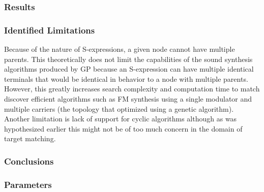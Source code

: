 \documentclass[12pt]{article}
\begin{document}
\subsubsection{Results}
\subsubsection{Identified Limitations}
Because of the nature of S-expressions, a given node cannot have multiple parents. This theoretically does not limit the capabilities of the sound synthesis algorithms produced by GP because an S-expression can have multiple identical terminals that would be identical in behavior to a node with multiple parents. However, this greatly increases search complexity and computation time to match discover efficient algorithms such as FM synthesis using a single modulator and multiple carriers (the topology that \citep{horner1993machine} optimized using a genetic algorithm). Another limitation is lack of support for cyclic algorithms although as was hypothesized earlier this might not be of too much concern in the domain of target matching.
\subsubsection{Conclusions}
\subsubsection{Parameters}
\end{document}
